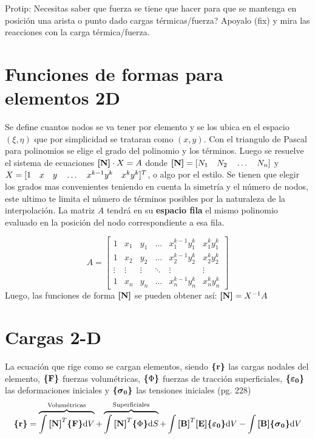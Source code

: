 Protip: Necesitas saber que fuerza se tiene que hacer para que se mantenga en posición una arista o punto dado cargas térmicas/fuerza? Apoyalo (fix) y mira las reacciones con la carga térmica/fuerza.






\section{Funciones de formas para elementos 2D}
Se define cuantos nodos se va tener por elemento y se los ubica en el espacio $(\xi,\eta)$ que por simplicidad se trataran como $(x,y)$. Con el triangulo de Pascal para polinomios se elige el grado del polinomio y los términos. Luego se resuelve el sistema de ecuaciones $\boldsymbol{[}\mathbf{N} \boldsymbol{]}\cdot X= A$ donde $\boldsymbol{[}\mathbf{N} \boldsymbol{]}=[N_1\ \ \  N_2 \ \ \  \ldots\ \ \  N_n]$ y $X=[1\ \ \  x\ \ \  y \ \ \ \ldots\ \ \  x^{k-1}y^{k} \ \ \  x^{k}y^{k}]^T$, o algo por el estilo. Se tienen que elegir los grados mas convenientes teniendo en cuenta la simetría y el número de nodos, este ultimo te limita el número de términos posibles por la naturaleza de la interpolación. La matriz $A$ tendrá en su \textbf{espacio fila} el mismo polinomio evaluado en la posición del nodo correspondiente a esa fila.

\[
A=
\begin{bmatrix}
    1 & x_1 & y_1 & \dots  & x_{1}^{k-1}y_1^{k} & x_{1}^{k}y_1^{k} \\
    1 & x_2 & y_2 & \dots  & x_{2}^{k-1}y_2^{k} & x_{2}^{k}y_2^{k} \\
    \vdots & \vdots & \vdots & \ddots & \vdots& \vdots \\
    1 & x_n & y_n & \dots  & x_{n}^{k-1}y_n^{k} & x_{n}^{k}y_n^{k}
\end{bmatrix}
\]
Luego, las funciones de forma $\boldsymbol{[}\mathbf{N} \boldsymbol{]}$ se pueden obtener así: $\boldsymbol{[}\mathbf{N} \boldsymbol{]}=X^{-1} A$

\section*{Cargas 2-D}
La ecuación que rige como se cargan elementos, siendo $\boldsymbol{\{ }\mathbf{r} \boldsymbol{\}}$ las cargas nodales del elemento, $\boldsymbol{\{ }\mathbf{F} \boldsymbol{\}}$ fuerzas volumétricas, $\boldsymbol{\{ } \Phi \boldsymbol{\} }$ fuerzas de tracción superficiales, $\boldsymbol{\{ }\mathbf{\boldsymbol{\varepsilon}_0} \boldsymbol{\}}$ las deformaciones iniciales y $\boldsymbol{\{ }\mathbf{\boldsymbol{\sigma}_0} \boldsymbol{\}}$ las tensiones iniciales (pg. 228)
\begin{equation} \label{eq:CargasGenerales}
\boldsymbol{\{ }\mathbf{r} \boldsymbol{\}}=\overbrace{\int \boldsymbol{[}\mathbf{N} \boldsymbol{]}^T \boldsymbol{\{ }\mathbf{F} \boldsymbol{\}} \textrm{d} V}^{\text{Volumétricas}} + \overbrace{\int \boldsymbol{[}\mathbf{N} \boldsymbol{]}^T \boldsymbol{\{ } \Phi \boldsymbol{\} } \textrm{d} S}^{\text{Superficiales}}+\int \boldsymbol{[}\mathbf{B} \boldsymbol{]}^T \boldsymbol{[}\mathbf{E} \boldsymbol{]} \boldsymbol{\{ }\mathbf{\boldsymbol{\varepsilon}_0} \boldsymbol{\}} \textrm{d} V- \int \boldsymbol{[}\mathbf{B} \boldsymbol{]} \boldsymbol{\{ }\mathbf{\boldsymbol{\sigma}_0} \boldsymbol{\}} \textrm{d} V
\end{equation}



